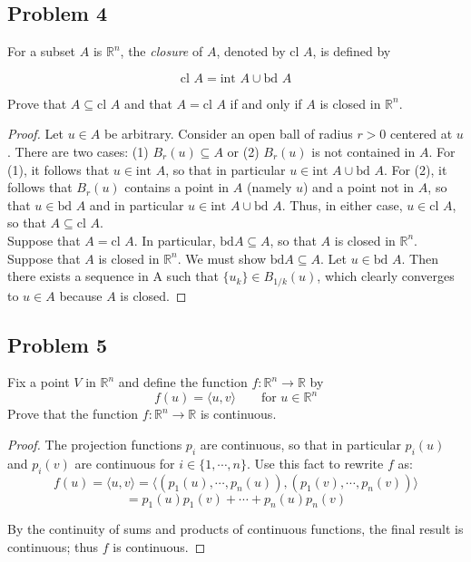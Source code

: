 \documentclass{article}
\begin{document}
\subsection*{Problem 4}

For a subset $A$ is $\mathbb{R}^n$, the \textit{closure} of $A$, denoted by cl $A$, is defined by

\[ \text{cl } A = \text{int } A \cup \text{bd } A\]

Prove that $A \subseteq \text{cl } A$ and that $A = \text{cl } A$ if and only if $A$ is closed in $\mathbb{R}^n$.

\begin{proof}
Let $u \in A$ be arbitrary. Consider an open ball of radius $r>0$ centered at $u$. There are two cases: (1) $B_r(u) \subseteq A$ or (2) $B_r(u)$ is not contained in $A$. For (1), it follows that $u \in \text{int } A$, so that in particular $u \in \text{int } A \cup \text{bd } A$. For (2), it follows that $B_r(u)$ contains a point in $A$ (namely $u$) and a point not in $A$, so that $u \in \text{bd } A$ and in particular $u \in \text{int } A \cup \text{bd } A$. Thus, in either case, $u \in \text{cl } A$, so that $A \subseteq \text{cl } A$. \\ 
Suppose that $A = \text{cl } A$. In particular, $\text{bd} A \subseteq A$, so that $A$ is closed in $\mathbb{R}^n$. \\
Suppose that $A$ is closed in $\mathbb{R}^n$. We must show $\text{bd} A \subseteq A$. Let $u \in \text{bd } A$. Then there exists a sequence in A such that $\{u_k\} \in B_{1/k}(u)$, which clearly converges to $u \in A$ because $A$ is closed. 


 

\end{proof}

\subsection*{Problem 5}
Fix a point $V$ in $\mathbb{R}^n$ and define the function $f \colon \mathbb{R}^n \to \mathbb{R}$ by
\[ f(u) = \langle u, v \rangle \qquad \text{for } u \in \mathbb{R}^n\]
Prove that the function $f \colon \mathbb{R}^n \to \mathbb{R}$ is continuous.

\begin{proof}

The projection functions $p_i$ are continuous, so that in particular $p_i(u)$ and $p_i(v)$ are continuous for $i \in \{1, \cdots, n\}$. Use this fact to rewrite $f$ as:
\[ f(u) = \langle u, v \rangle = \langle (p_1(u), \cdots, p_n(u)), (p_1(v), \cdots, p_n(v)) \rangle \]
\[ = p_1(u)p_1(v) + \cdots + p_n(u)p_n(v) \]

By the continuity of sums and products of continuous functions, the final result is continuous; thus $f$ is continuous.

\end{proof}
\end{document}
